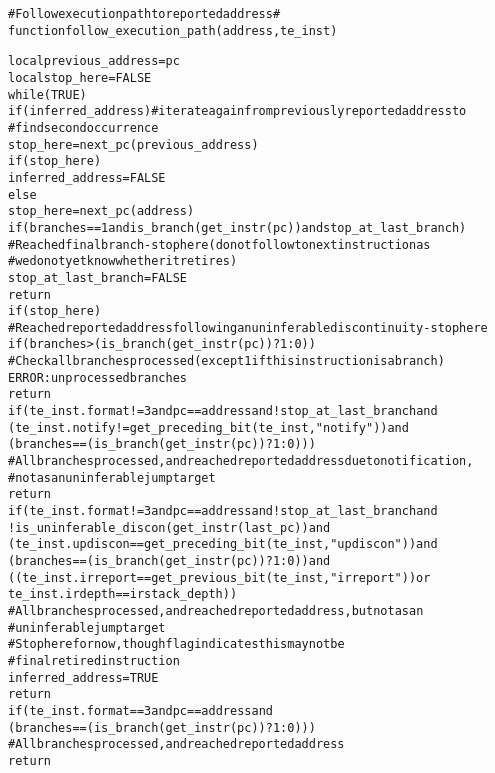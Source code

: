 \begin{alltt}
# Follow execution path to reported address #
function follow_execution_path(address, te_inst)

  local previous_address = pc
  local stop_here        = FALSE
  while (TRUE)
    if (inferred_address) # iterate again from previously reported address to
                          #   find second occurrence
      stop_here = next_pc(previous_address)
      if (stop_here)
        inferred_address = FALSE
    else
      stop_here = next_pc(address)
      if (branches == 1 and is_branch(get_instr(pc)) and stop_at_last_branch)
        # Reached final branch - stop here (do not follow to next instruction as
        #  we do not yet know whether it retires)
        stop_at_last_branch = FALSE
        return
      if (stop_here)
        # Reached reported address following an uninferable discontinuity - stop here
        if (branches > (is_branch(get_instr(pc)) ? 1 : 0))
          # Check all branches processed (except 1 if this instruction is a branch)
          ERROR: unprocessed branches
        return
      if (te_inst.format != 3 and pc == address and !stop_at_last_branch and
        (te_inst.notify != get_preceding_bit(te_inst, "notify")) and 
        (branches == (is_branch(get_instr(pc)) ? 1 : 0)))
          # All branches processed, and reached reported address due to notification,
          # not as an uninferable jump target
        return
      if (te_inst.format != 3 and pc == address and !stop_at_last_branch and
        !is_uninferable_discon(get_instr(last_pc)) and 
        (te_inst.updiscon == get_preceding_bit(te_inst, "updiscon")) and 
        (branches == (is_branch(get_instr(pc)) ? 1 : 0)) and
        ((te_inst.irreport == get_previous_bit(te_inst, "irreport")) or 
         te_inst.irdepth == irstack_depth))
          # All branches processed, and reached reported address, but not as an
          #   uninferable jump target
          # Stop here for now, though flag indicates this may not be
          #  final retired instruction
        inferred_address = TRUE
        return
      if (te_inst.format == 3 and pc == address and
        (branches == (is_branch(get_instr(pc)) ? 1 : 0)))
        # All branches processed, and reached reported address
        return
\end{alltt}

\pagebreak

